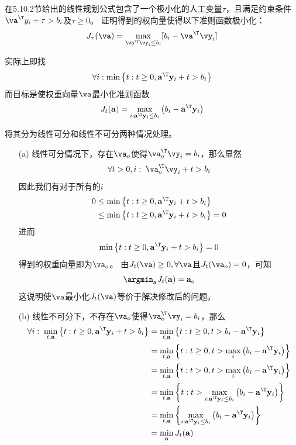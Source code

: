 \documentclass[reportComp]{thesis}
\begin{document}
\begin{question}[\textsection 5 Q28]
在5.10.2节给出的线性规划公式包含了一个极小化的人工变量$\tau$，且满足约束条件$\va^\T y_i+\tau>b_i$及$\tau\geq 0$。
证明得到的权向量使得以下准则函数极小化：
\[J_\tau(\va)=\max_{\va^\T \vy_i\leq b_i}[b_i-\va^\T \vy_i]\]
\end{question}
\begin{answer}
实际上即找
\[\forall i:\min \left\{t: t \geq 0, \mathbf{a}^\T  \mathbf{y}_{i}+t>b_{i}\right\}\]
而目标是使权重向量$\va$最小化准则函数
\[J_{t}(\mathbf{a})=\max _{i: \mathbf{a}^\T  \mathbf{y}_{i} \leq b_{i}}\left(b_{i}-\mathbf{a}^\T  \mathbf{y}_{i}\right)\]

将其分为线性可分和线性不可分两种情况处理。
\begin{itemize}
	\item [(a)] 线性可分情况下，存在$\va_o$使得$\va_o^\T \vy_i=b_i$，那么显然
	\[\forall t>0,i:\; \va_o^\T \vy_i+t > b_i\]
	因此我们有对于所有的$i$
	\[\begin{aligned}
	0 & \leq \min \left\{t: t \geq 0, \mathbf{a}^\T  \mathbf{y}_{i}+t>b_{i}\right\} \\
	 & \leq \min \left\{t: t \geq 0, \mathbf{a}^\T  \mathbf{y}_{i}+t>b_{i}\right\}=0
	\end{aligned}\]
	进而
	\[\min \left\{t: t \geq 0, \mathbf{a}^\T  \mathbf{y}_{i}+t>b_{i}\right\}=0\]
	得到的权重向量即为$\va_o$。
	由$J_t(\va)\geq 0,\forall\va$且$J_t(\va_o)=0$，可知
	\[\argmin_{\mathbf{a}} J_{t}(\mathbf{a})=\mathbf{a}_{o}\]
	这说明使$\va$最小化$J_t(\va)$等价于解决修改后的问题。
	\item [(b)] 线性不可分下，不存在$\va_o$使得$\va_o^\T \vy_i=b_i$，那么
	\[\begin{aligned}
	\forall i:\;\min _{t, \mathbf{a}}\left\{t: t \geq 0, \mathbf{a}^\T  \mathbf{y}_{i}+t>b_{i}\right\}
	&=\min _{t, \mathbf{a}}\left\{t: t \geq 0, t>b_{i}-\mathbf{a}^\T  \mathbf{y}_{i}\right\} \\
	&=\min _{t, \mathbf{a}}\left\{t: t \geq 0, t>\max _{i}\left(b_{i}-\mathbf{a}^\T  \mathbf{y}_{i}\right)\right\} \\
	&=\min _{t, \mathbf{a}}\left\{t: t>0, t>\max _{i}\left(b_{i}-\mathbf{a}^\T  \mathbf{y}_{i}\right)\right\} \\
	&=\min _{t, \mathbf{a}}\left\{t: t>\max _{i: \mathbf{a}^\T  \mathbf{y}_{i} \leq b_{i}}\left(b_{i}-\mathbf{a}^\T  \mathbf{y}_{i}\right)\right\} \\
	&=\min _{t, \mathbf{a}}\left\{\max _{i: \mathbf{a}^\T  \mathbf{y}_{i} \leq b_{i}}\left(b_{i}-\mathbf{a}^\T  \mathbf{y}_{i}\right)\right\} \\
	&=\min _{\mathbf{a}} J_{t}(\mathbf{a})
	\end{aligned}\]
\end{itemize}
\end{answer}
\end{document}
